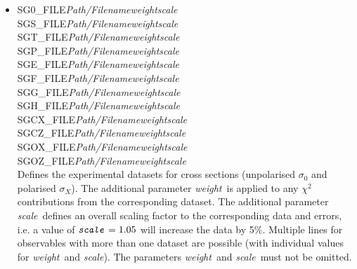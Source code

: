 \documentclass[a4paper,10pt]{article}
\def\bl{\phantom{0}}
\def\tt{\ttfamily}
\def\rm{\rmfamily}
\begin{document}
\begin{itemize}
\item
\tt SG0\_FILE\bl\bl \textit{Path/Filename}\bl \textit{weight}\bl \textit{scale}\rm\\
\tt SGS\_FILE\bl\bl \textit{Path/Filename}\bl \textit{weight}\bl \textit{scale}\rm\\
\tt SGT\_FILE\bl\bl \textit{Path/Filename}\bl \textit{weight}\bl \textit{scale}\rm\\
\tt SGP\_FILE\bl\bl \textit{Path/Filename}\bl \textit{weight}\bl \textit{scale}\rm\\
\tt SGE\_FILE\bl\bl \textit{Path/Filename}\bl \textit{weight}\bl \textit{scale}\rm\\
\tt SGF\_FILE\bl\bl \textit{Path/Filename}\bl \textit{weight}\bl \textit{scale}\rm\\
\tt SGG\_FILE\bl\bl \textit{Path/Filename}\bl \textit{weight}\bl \textit{scale}\rm\\
\tt SGH\_FILE\bl\bl \textit{Path/Filename}\bl \textit{weight}\bl \textit{scale}\rm\\
\tt SGCX\_FILE\bl   \textit{Path/Filename}\bl \textit{weight}\bl \textit{scale}\rm\\
\tt SGCZ\_FILE\bl   \textit{Path/Filename}\bl \textit{weight}\bl \textit{scale}\rm\\
\tt SGOX\_FILE\bl   \textit{Path/Filename}\bl \textit{weight}\bl \textit{scale}\rm\\
\tt SGOZ\_FILE\bl   \textit{Path/Filename}\bl \textit{weight}\bl \textit{scale}\rm\\
Defines the experimental datasets for cross sections (unpolarised $\sigma_0$ and polarised $\sigma_X$). The additional
parameter \tt\textit{weight}\rm\ is applied to any $\chi^2$ contributions from the corresponding dataset. The additional
parameter \tt\textit{scale}\rm\ defines an overall scaling factor to the corresponding data and errors, i.e.
a value of $\mbox{\tt\textit{scale}\rm} = 1.05$ will increase the data by 5\%.
Multiple lines for observables with more than one dataset are possible (with individual values for
\tt\textit{weight}\rm\ and \tt\textit{scale}\rm).
The parameters \tt\textit{weight}\rm\ and \tt\textit{scale}\rm\ must not be omitted.


\end{itemize}
\end{document}
